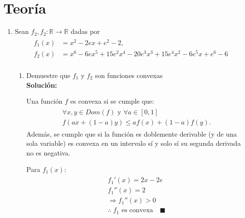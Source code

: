 \documentclass[10pt,letterpaper]{article}
\begin{document}
\section{Teoría}
    \begin{enumerate}
        \item Sean $f_2, f_2: \mathbb{R} \rightarrow \mathbb{R}$ dadas por
            \begin{equation*} \begin{split} \begin{aligned}
                f_1(x) &= x^2 - 2ex + e^2 - 2, \\
                f_2(x) &= x^6 - 6ex^5 + 15e^2x^4 - 20e^3x^3 + 15e^4x^2 - 6e^5x + e^6 - 6 \\
            \end{aligned} \end{split} \end{equation*}

            \begin{enumerate}
                \item Demuestre que $f_1$ y $f_2$ son funciones convexas \\

                    \textbf{Solución:}

                    Una función $f$ es convexa si se cumple que:
                    \begin{equation*} \begin{split} \begin{gathered}
                        \forall x, y \in Dom(f)  \text{ y } \forall a \in [0, 1] \\
                        f(ax + (1-a)y) \leq af(x) + (1 - a)f(y).
                    \end{gathered} \end{split} \end{equation*}
                    Además, se cumple que si la función es doblemente derivable
                    (y de una sola variable) es convexa en un intervalo sí y solo sí
                    su segunda derivada no es negativa.

                    Para $f_1(x)$:
                    \begin{equation*} \begin{split} \begin{gathered}
                        f_1'(x) = 2x - 2e \\
                        f_1''(x) = 2 \\
                        \Rightarrow f_1''(x) > 0 \\
                        \therefore \; f_1 \text{ es convexa} \quad \blacksquare
                    \end{gathered} \end{split} \end{equation*}


\end{enumerate}
\end{enumerate}
\end{document}
